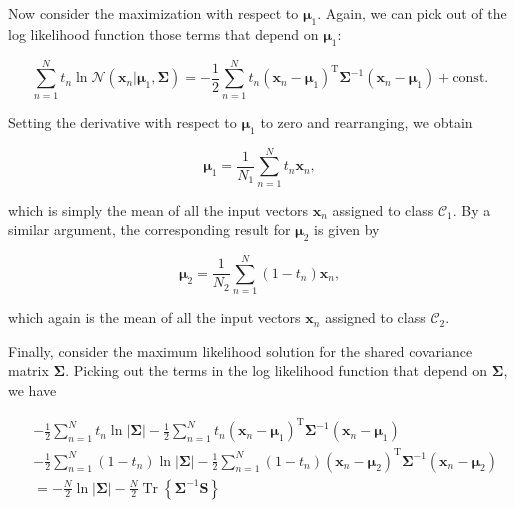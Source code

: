 \documentclass{article}
\begin{document}
Now consider the maximization with respect to $\boldsymbol{\mu}_{1}$. Again, we can pick out of the log likelihood function those terms that depend on $\boldsymbol{\mu}_{1}$:

\begin{equation}
\sum_{n=1}^{N}t_{n}\ln\mathcal{N}(\mathbf{x}_{n}|\boldsymbol{\mu}_{1},\boldsymbol{\Sigma})=-\frac{1}{2}\sum_{n=1}^{N}t_{n}(\mathbf{x}_{n}-\boldsymbol{\mu}_{1})^{\mathrm{T}}\boldsymbol{\Sigma}^{-1}(\mathbf{x}_{n}-\boldsymbol{\mu}_{1})+\text{const.}
\tag{5.57}
\end{equation}

Setting the derivative with respect to $\boldsymbol{\mu}_{1}$ to zero and rearranging, we obtain

\begin{equation}
\boldsymbol{\mu}_{1}=\frac{1}{N_{1}}\sum_{n=1}^{N}t_{n}\mathbf{x}_{n},
\tag{5.58}
\end{equation}

which is simply the mean of all the input vectors $\mathbf{x}_{n}$ assigned to class $\mathcal{C}_{1}$. By a similar argument, the corresponding result for $\boldsymbol{\mu}_{2}$ is given by

\begin{equation}
\boldsymbol{\mu}_{2}=\frac{1}{N_{2}}\sum_{n=1}^{N}(1-t_{n})\mathbf{x}_{n},
\tag{5.59}
\end{equation}

which again is the mean of all the input vectors $\mathbf{x}_{n}$ assigned to class $\mathcal{C}_{2}$.

Finally, consider the maximum likelihood solution for the shared covariance matrix $\boldsymbol{\Sigma}$. Picking out the terms in the log likelihood function that depend on $\boldsymbol{\Sigma}$, we have

\begin{align}
&-\frac{1}{2}\sum_{n=1}^{N}t_{n}\ln|\boldsymbol{\Sigma}|-\frac{1}{2}\sum_{n=1}^{N}t_{n}(\mathbf{x}_{n}-\boldsymbol{\mu}_{1})^{\mathrm{T}}\boldsymbol{\Sigma}^{-1}(\mathbf{x}_{n}-\boldsymbol{\mu}_{1}) \\
&-\frac{1}{2}\sum_{n=1}^{N}(1-t_{n})\ln|\boldsymbol{\Sigma}|-\frac{1}{2}\sum_{n=1}^{N}(1-t_{n})(\mathbf{x}_{n}-\boldsymbol{\mu}_{2})^{\mathrm{T}}\boldsymbol{\Sigma}^{-1}(\mathbf{x}_{n}-\boldsymbol{\mu}_{2}) \\
&=-\frac{N}{2}\ln|\boldsymbol{\Sigma}|-\frac{N}{2}\operatorname{Tr}\left\{\boldsymbol{\Sigma}^{-1}\mathbf{S}\right\}
\tag{5.60}
\end{align}
\end{document}

